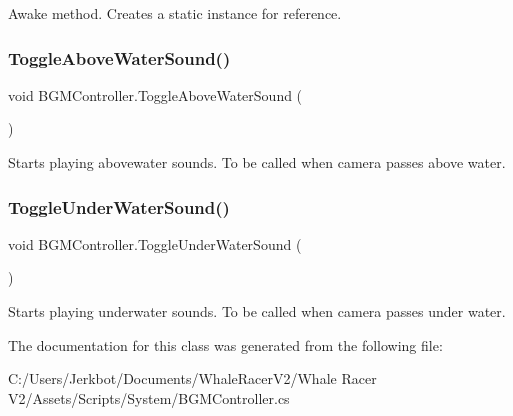 Awake method. Creates a static instance for reference. 

\mbox{\label{class_b_g_m_controller_afe57a67a897f90d66a636c55bd5801ac}} 
\subsubsection{\texorpdfstring{Toggle\+Above\+Water\+Sound()}{ToggleAboveWaterSound()}}
{\footnotesize\ttfamily void B\+G\+M\+Controller.\+Toggle\+Above\+Water\+Sound (\begin{DoxyParamCaption}{ }\end{DoxyParamCaption})}



Starts playing abovewater sounds. To be called when camera passes above water. 

\mbox{\label{class_b_g_m_controller_aeba3eaf3dfafbbd774a7910569f858b0}} 
\subsubsection{\texorpdfstring{Toggle\+Under\+Water\+Sound()}{ToggleUnderWaterSound()}}
{\footnotesize\ttfamily void B\+G\+M\+Controller.\+Toggle\+Under\+Water\+Sound (\begin{DoxyParamCaption}{ }\end{DoxyParamCaption})}



Starts playing underwater sounds. To be called when camera passes under water. 



The documentation for this class was generated from the following file\+:\begin{DoxyCompactItemize}
\item 
C\+:/\+Users/\+Jerkbot/\+Documents/\+Whale\+Racer\+V2/\+Whale Racer V2/\+Assets/\+Scripts/\+System/B\+G\+M\+Controller.\+cs\end{DoxyCompactItemize}
